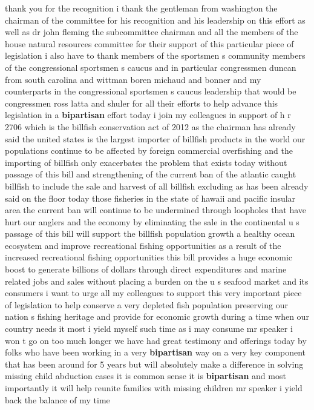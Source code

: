 \documentclass{article}
\begin{document}
thank you for the recognition i thank the gentleman from washington the chairman of the committee for his recognition and his leadership on this effort as well as dr john fleming the subcommittee chairman and all the members of the house natural resources committee for their support of this particular piece of legislation i also have to thank members of the sportsmen s community members of the congressional sportsmen s caucus and in particular congressmen duncan from south carolina and wittman boren michaud and bonner and my counterparts in the congressional sportsmen s caucus leadership that would be congressmen ross latta and shuler for all their efforts to help advance this legislation in a {\bf \color{red} bipartisan} effort today i join my colleagues in support of h r 2706 which is the billfish conservation act of 2012 as the chairman has already said the united states is the largest importer of billfish products in the world our populations continue to be affected by foreign commercial overfishing and the importing of billfish only exacerbates the problem that exists today without passage of this bill and strengthening of the current ban of the atlantic caught billfish to include the sale and harvest of all billfish excluding as has been already said on the floor today those fisheries in the state of hawaii and pacific insular area the current ban will continue to be undermined through loopholes that have hurt our anglers and the economy by eliminating the sale in the continental u s passage of this bill will support the billfish population growth a healthy ocean ecosystem and improve recreational fishing opportunities as a result of the increased recreational fishing opportunities this bill provides a huge economic boost to generate billions of dollars through direct expenditures and marine related jobs and sales without placing a burden on the u s seafood market and its consumers i want to urge all my colleagues to support this very important piece of legislation to help conserve a very depleted fish population preserving our nation s fishing heritage and provide for economic growth during a time when our country needs it most
\vspace{8mm}
i yield myself such time as i may consume mr speaker i won t go on too much longer we have had great testimony and offerings today by folks who have been working in a very {\bf \color{red} bipartisan} way on a very key component that has been around for 5 years but will absolutely make a difference in solving missing child abduction cases it is common sense it is {\bf \color{red} bipartisan} and most importantly it will help reunite families with missing children mr speaker i yield back the balance of my time\pagebreak
\end{document}
